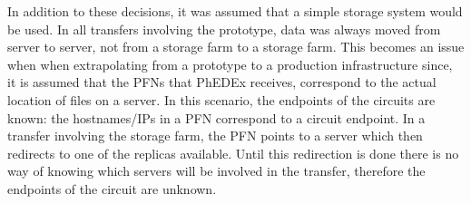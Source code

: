 In addition to these decisions, it was assumed that a simple storage system would be used.
In all transfers involving the prototype, data was always moved from server to server, not 
from a storage farm to a storage farm. This becomes an issue when when extrapolating from a 
prototype to a production infrastructure since, it is assumed that the PFNs that PhEDEx 
receives, correspond to the actual location of files on a server. In this scenario, the 
endpoints of the circuits are known: the hostnames/IPs in a PFN correspond to a circuit 
endpoint.
In a transfer involving the storage farm, the PFN points to a server which then redirects 
to one of the replicas available. Until this redirection is done there is no way of knowing 
which servers will be involved in the transfer, therefore the endpoints of the circuit are 
unknown.